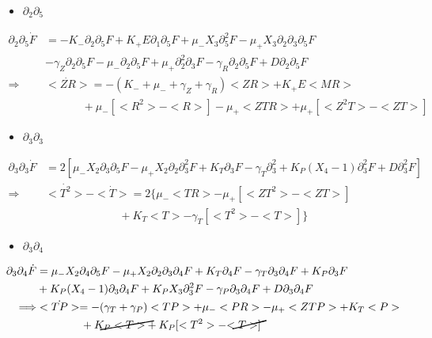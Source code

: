 \documentclass{article}
\begin{document}
\begin{itemize}
    \item $\partial_2\partial_5$
\end{itemize}
\begin{align*}
    \partial_2\partial_5\Dot{F} &= -K_-\partial_2\partial_5F + K_+E\partial_1\partial_5F + \mu_-X_3\partial_5^2F - \mu_+X_3\partial_2\partial_3\partial_5F\\
                                &- \gamma_Z\partial_2\partial_5F - \mu_-\partial_2\partial_5F + \mu_+\partial_2^2\partial_3F - \gamma_R\partial_2\partial_5F + D\partial_2\partial_5F\\
            \Longrightarrow     &<\Dot{ZR}> = - (K_- + \mu_- + \gamma_Z + \gamma_R)<ZR> + K_+E<MR> \\
                                & \hspace{40pt} + \mu_-[<R^2>-<R>] -\mu_+<ZTR> + \mu_+[<Z^2T>-<ZT>]
\end{align*}

\begin{itemize}
    \item $\partial_3\partial_3$
\end{itemize}
\begin{align*}
    \partial_3\partial_3\Dot{F} &= 2[\mu_-X_2\partial_3\partial_5F - \mu_+X_2\partial_2\partial_3^2F + K_T\partial_3F - \gamma_T\partial_3^2 + K_P(X_4-1)\partial_3^2F + D\partial_3^2F]\\
    \Longrightarrow & <\Dot{T^2}>-<\Dot{T}> = 2\{\mu_-<TR> - \mu_+[<ZT^2> - <ZT>]\\
                    & \hspace{80pt}+ K_T<T> - \gamma_T[<T^2>-<T>]\}
\end{align*}

\begin{itemize}
    \item $\partial_3\partial_4$
\end{itemize}
\begin{align*}
    \partial_3\partial_4\Dot{F} &= \mu_-X_2\partial_4\partial_5F - \mu_+X_2\partial_2\partial_3\partial_4F + K_T\partial_4F - \gamma_T\partial_3\partial_4F + K_P\partial_3F\\
                                &+ K_P(X_4-1)\partial_3\partial_4F + K_PX_3\partial_3^2F - \gamma_P\partial_3\partial_4F + D\partial_3\partial_4F\\
                \Longrightarrow & <\Dot{TP}> = -(\gamma_T + \gamma_P)<TP> + \mu_-<PR> - \mu_+<ZTP> + K_T<P>\\
                                & \hspace{40pt}+ \cancel{K_P<T>} + K_P[<T^2>-\cancel{<T>}]
\end{align*}
\end{document}
